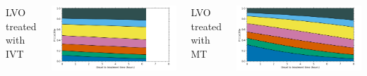 \documentclass[xcolor={usenames,dvipsnames}]{beamer}
\begin{document}
\begin{frame}[noframenumbering]
\begin{columns}
    LVO treated with IVT
    \begin{center} 
    \includegraphics[width=\textwidth]{./images/probs_with_time_lvo_ivt}
    \end{center} 
    LVO treated with MT 
    \begin{center} 
    \includegraphics[width=\textwidth]{./images/probs_with_time_lvo_mt}
    \end{center} 
\end{columns}



\end{frame}


\end{document}
